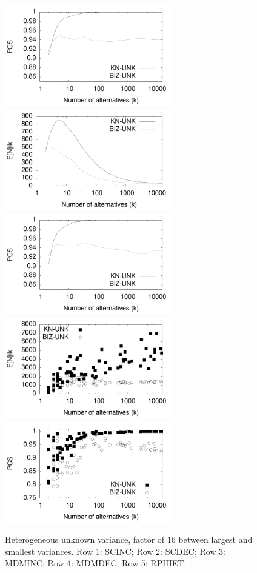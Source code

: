 \documentclass[12pt]{article}
\begin{document}
\begin{figure}[tb]
    \includegraphics[width=2.9in]{pdf/FINAL-UNK-MDMINC-PCS}
    \includegraphics[width=2.9in]{pdf/FINAL-UNK-MDMDEC-Nk} 
    \includegraphics[width=2.9in]{pdf/FINAL-UNK-MDMDEC-PCS}
    \includegraphics[width=2.9in]{pdf/FINAL-UNK-RPIHET-Nk} 
    \includegraphics[width=2.9in]{pdf/FINAL-UNK-RPIHET-PCS}

    \caption{Heterogeneous unknown variance, factor of 16 between largest and smallest variances.
    Row 1: SCINC;
    Row 2: SCDEC;
    Row 3: MDMINC;
    Row 4: MDMDEC;
    Row 5: RPIHET.
    }
  \end{figure}
\end{document}
